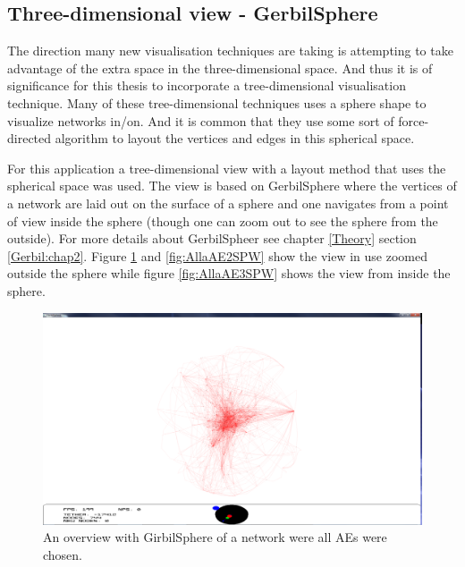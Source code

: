 \documentclass[a4paper,11pt]{kth-mag}
\begin{document}
\subsection{Three-dimensional view - GerbilSphere}
The direction many new visualisation techniques are taking is attempting to take advantage of the extra space in the three-dimensional space. And thus it is of significance for this thesis to incorporate a 
tree-dimensional visualisation technique. Many of these tree-dimensional techniques uses a sphere shape to visualize networks in/on. And it is common that they use some sort of force-directed algorithm
to layout the vertices and edges in this spherical space.

For this application a tree-dimensional view with a layout method that uses the spherical space was used. The view is based on GerbilSphere \cite{Shelley20121016} where the vertices of a network are laid out
 on the surface of a sphere and one navigates from a point of view inside the sphere (though one can zoom out to see the sphere from the outside). For more details about GerbilSpheer see chapter \ref{Theory}
 section \ref{Gerbil:chap2}. Figure \ref{fig:AllaAE1SPW} and \ref{fig:AllaAE2SPW} show the view in use zoomed outside the sphere while figure \ref{fig:AllaAE3SPW} shows the view from inside the sphere.

\begin{figure}[!htbp]
	\centering
	\includegraphics[scale=0.3]{SesammVisualAppPics/SphericalView/AE/AE1}
	\caption{An overview with GirbilSphere of a network were all AEs were chosen.}
	\label{fig:AllaAE1SPW}
\end{figure}
\end{document}
